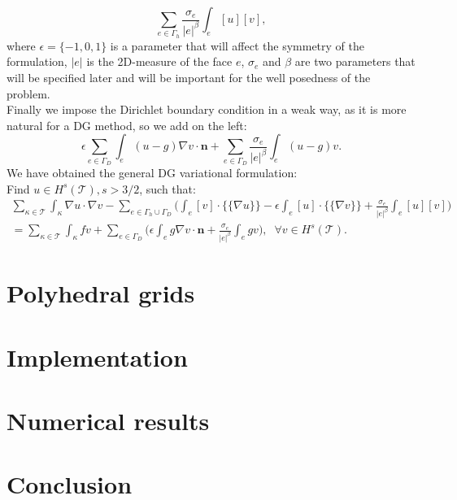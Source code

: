 \documentclass[12pt, a4paper]{article}
\begin{document}
\begin{equation*}
	\sum_{e \in \Gamma_h} \frac{\sigma_e}{|e|^\beta} \int_e [u][v],
\end{equation*}
where $\epsilon = \{-1, 0, 1\}$ is a parameter that will affect the symmetry of the formulation, $|e|$ is the 2D-measure of the face $e$, $\sigma_e$ and $\beta$ are two parameters that will be specified later and will be important for the well posedness of the problem.\\
Finally we impose the Dirichlet boundary condition in a weak way, as it is more natural for a DG method, so we add on the left:
\begin{equation*}
	\epsilon \sum_{e \in \Gamma_D} \int_e (u-g) \nabla v \cdot \mathbf{n}
	+ \sum_{e \in \Gamma_D} \frac{\sigma_e}{|e|^\beta} \int_e (u-g)v.
\end{equation*}
We have obtained the general DG variational formulation:\\
Find $u \in H^s(\mathcal{T}), s>3/2$, such that:
\begin{multline} \label{eq:dgvarform}
	\sum_{\kappa \in \mathcal{T}} \int_\kappa \nabla u \cdot \nabla v
	-\sum_{e \in \Gamma_h \cup \Gamma_D} \bigg( \int_e [v] \cdot \{\!\!\{ \nabla u \}\!\!\}
	-\epsilon \int_e [u] \cdot \{\!\!\{ \nabla v \}\!\!\}
	+ \frac{\sigma_e}{|e|^\beta} \int_e [u][v] \bigg)\\
	= \sum_{\kappa \in \mathcal{T}} \int_\kappa fv
	+ \sum_{e \in \Gamma_D} \bigg( \epsilon \int_e g \nabla v \cdot \mathbf{n}
	+ \frac{\sigma_e}{|e|^\beta} \int_e gv \bigg), \;\; \forall v \in H^s(\mathcal{T}).
\end{multline}

\section{Polyhedral grids}\label{sec:poly}

\section{Implementation}\label{sec:imp}
	
\section{Numerical results}\label{sec:res}

\section{Conclusion}\label{sec:conc}
\end{document}
